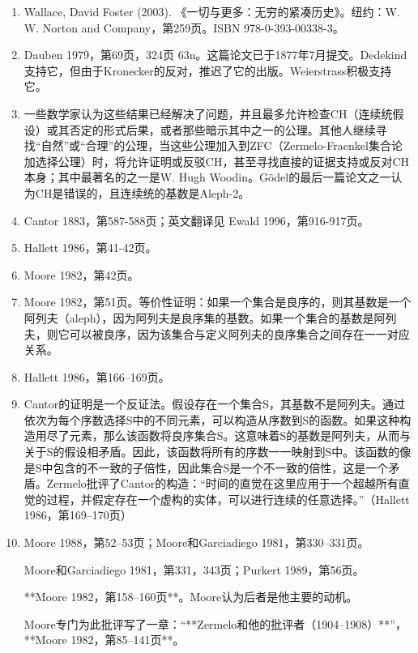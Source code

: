 \begin{enumerate}
\item Wallace, David Foster (2003). 《一切与更多：无穷的紧凑历史》。纽约：W. W. Norton and Company，第259页。ISBN 978-0-393-00338-3。
\item Dauben 1979，第69页，324页 63n。这篇论文已于1877年7月提交。Dedekind支持它，但由于Kronecker的反对，推迟了它的出版。Weierstrass积极支持它。
\item 一些数学家认为这些结果已经解决了问题，并且最多允许检查CH（连续统假设）或其否定的形式后果，或者那些暗示其中之一的公理。其他人继续寻找“自然”或“合理”的公理，当这些公理加入到ZFC（Zermelo-Fraenkel集合论加选择公理）时，将允许证明或反驳CH，甚至寻找直接的证据支持或反对CH本身；其中最著名的之一是W. Hugh Woodin。Gödel的最后一篇论文之一认为CH是错误的，且连续统的基数是Aleph-2。
\item Cantor 1883，第587-588页；英文翻译见 Ewald 1996，第916-917页。
\item Hallett 1986，第41-42页。
\item Moore 1982，第42页。
\item Moore 1982，第51页。等价性证明：如果一个集合是良序的，则其基数是一个阿列夫（aleph），因为阿列夫是良序集的基数。如果一个集合的基数是阿列夫，则它可以被良序，因为该集合与定义阿列夫的良序集合之间存在一一对应关系。
\item Hallett 1986，第166–169页。
\item Cantor的证明是一个反证法。假设存在一个集合S，其基数不是阿列夫。通过依次为每个序数选择S中的不同元素，可以构造从序数到S的函数。如果这种构造用尽了元素，那么该函数将良序集合S。这意味着S的基数是阿列夫，从而与关于S的假设相矛盾。因此，该函数将所有的序数一一映射到S中。该函数的像是S中包含的不一致的子倍性，因此集合S是一个不一致的倍性，这是一个矛盾。Zermelo批评了Cantor的构造：“时间的直觉在这里应用于一个超越所有直觉的过程，并假定存在一个虚构的实体，可以进行连续的任意选择。”（Hallett 1986，第169–170页）
\item Moore 1988，第52–53页；Moore和Garciadiego 1981，第330–331页。

Moore和Garciadiego 1981，第331，343页；Purkert 1989，第56页。

**Moore 1982，第158–160页**。Moore认为后者是他主要的动机。

Moore专门为此批评写了一章：“**Zermelo和他的批评者（1904–1908）**”，**Moore 1982，第85–141页**。

\end{enumerate}
